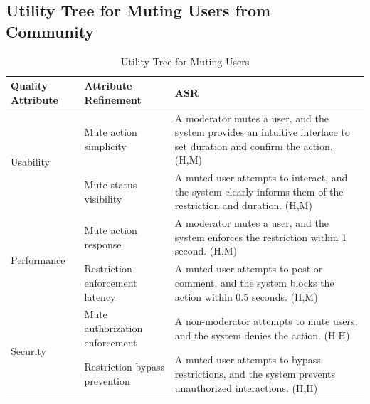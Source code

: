 \documentclass{article}
\begin{document}
\subsection{Utility Tree for Muting Users from Community}

\begin{table}[H]
    \centering
    \caption{Utility Tree for Muting Users}
    \begin{tabular}{|p{3cm}|p{4cm}|p{7cm}|}
        \hline
        \textbf{Quality Attribute} & \textbf{Attribute Refinement}                                                                                          & \textbf{ASR} \\
        \hline

        \multirow{2}{*}{Usability}
                                   & Mute action simplicity
                                   & A moderator mutes a user, and the system provides an intuitive interface to set duration and confirm the action. (H,M)                \\
        \cline{2-3}
                                   & Mute status visibility
                                   & A muted user attempts to interact, and the system clearly informs them of the restriction and duration. (H,M)                         \\
        \hline

        \multirow{2}{*}{Performance}
                                   & Mute action response
                                   & A moderator mutes a user, and the system enforces the restriction within 1 second. (H,M)                                              \\
        \cline{2-3}
                                   & Restriction enforcement latency
                                   & A muted user attempts to post or comment, and the system blocks the action within 0.5 seconds. (H,M)                                  \\
        \hline

        \multirow{2}{*}{Security}
                                   & Mute authorization enforcement
                                   & A non-moderator attempts to mute users, and the system denies the action. (H,H)                                                       \\
        \cline{2-3}
                                   & Restriction bypass prevention
                                   & A muted user attempts to bypass restrictions, and the system prevents unauthorized interactions. (H,H)                                \\
        \hline


\end{tabular}
\end{table}
\end{document}
